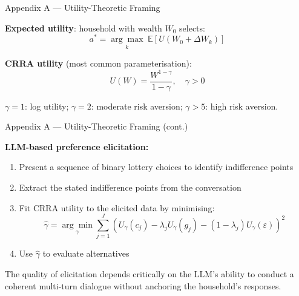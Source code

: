 \documentclass[9pt,t]{beamer}
\begin{document}
\begin{frame}[noframenumbering]{Appendix A --- Utility-Theoretic Framing}

\textbf{Expected utility}: household with wealth $W_0$ selects:
\[
  a^* = \underset{k}{\arg\max} \; \mathbb{E}[U(W_0 + \Delta W_k)]
\]

\textbf{CRRA utility} (most common parameterisation):
\[
  U(W) = \frac{W^{1-\gamma}}{1-\gamma}, \quad \gamma > 0
\]

$\gamma = 1$: log utility; $\gamma = 2$: moderate risk aversion; $\gamma > 5$: high risk aversion.
\end{frame}

\begin{frame}[noframenumbering]{Appendix A --- Utility-Theoretic Framing (cont.)}

\textbf{LLM-based preference elicitation:}
\begin{enumerate}
  \item Present a sequence of binary lottery choices to identify indifference points
  \item Extract the stated indifference points from the conversation
  \item Fit CRRA utility to the elicited data by minimising:
    \[
      \hat{\gamma} = \underset{\gamma}{\arg\min} \sum_{j=1}^{J} \left( U_\gamma(c_j) - \lambda_j U_\gamma(g_j) - (1-\lambda_j) U_\gamma(\varepsilon) \right)^2
    \]
  \item Use $\hat{\gamma}$ to evaluate alternatives
\end{enumerate}

\medskip
The quality of elicitation depends critically on the LLM's ability to conduct a coherent
multi-turn dialogue without anchoring the household's responses.
\end{frame}
\end{document}
